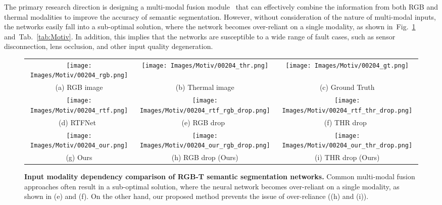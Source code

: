 \documentclass[10pt,twocolumn,letterpaper]{article}
\newcommand{\figref}[1]{Fig.~\ref{#1}}
\newcommand{\tabref}[1]{Tab.~\ref{#1}}
\begin{document}
The primary research direction is designing a multi-modal fusion module~\cite{xu2021attention,zhang2021abmdrnet,deng2021feanet,liu2022cmx} that can effectively combine the information from both RGB and thermal modalities to improve the accuracy of semantic segmentation. 
However, without consideration of the nature of multi-modal inputs, the networks easily fall into a sub-optimal solution, where the network becomes over-reliant on a single modality, as shown in~\figref{fig:motiv} and~\tabref{tab:Motiv}.
In addition, this implies that the networks are susceptible to a wide range of fault cases, such as sensor disconnection, lens occlusion, and other input quality degeneration. 

\begin{figure}[t]
\begin{center}
{
\begin{tabular}{c@{\hskip 0.005\linewidth}c@{\hskip 0.005\linewidth}c}
\texttt{[image: Images/Motiv/00204\_rgb.png]} &
\texttt{[image: Images/Motiv/00204\_thr.png]} &
\texttt{[image: Images/Motiv/00204\_gt.png]} \\
{\footnotesize (a) RGB image} & {\footnotesize (b) Thermal image } & {\footnotesize (c) Ground Truth} \\
\texttt{[image: Images/Motiv/00204\_rtf.png]} &
\texttt{[image: Images/Motiv/00204\_rtf\_rgb\_drop.png]} &
\texttt{[image: Images/Motiv/00204\_rtf\_thr\_drop.png]} \\
{\footnotesize (d) RTFNet~\cite{sun2019rtfnet}} & {\footnotesize (e) RGB drop~\cite{sun2019rtfnet}} & {\footnotesize (f) THR drop~\cite{sun2019rtfnet}} \\
\texttt{[image: Images/Motiv/00204\_our.png]} &
\texttt{[image: Images/Motiv/00204\_our\_rgb\_drop.png]} &
\texttt{[image: Images/Motiv/00204\_our\_thr\_drop.png]} \\
{\footnotesize (g) Ours} & {\footnotesize (h) RGB drop (Ours)} & {\footnotesize (i) THR drop (Ours)} \\
\end{tabular}
}
\end{center}
\vspace{-0.1in}
\caption{{\bf Input modality dependency comparison of RGB-T semantic segmentation networks.}
Common multi-modal fusion approaches often result in a sub-optimal solution, where the neural network becomes over-reliant on a single modality, as shown in (e) and (f).
On the other hand, our proposed method prevents the issue of over-reliance ((h) and (i)). 
}
\label{fig:motiv}
\end{figure}
\end{document}
